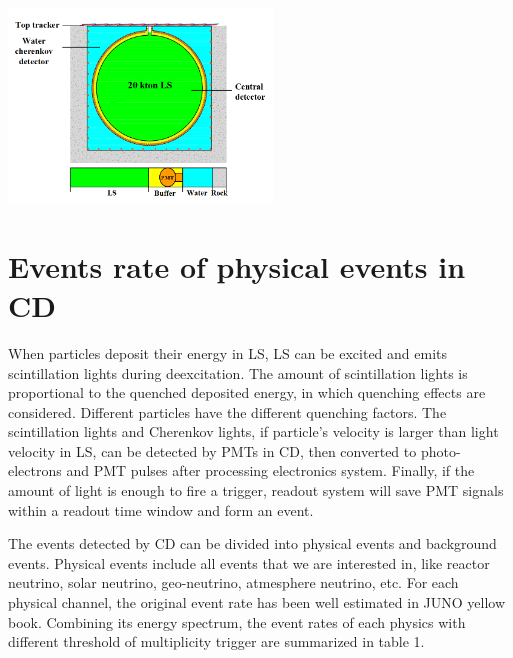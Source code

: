 \documentclass[a4paper,10pt,twoside]{paper}
\begin{document}
\begin{multicols}{2}
		\begin{center}
			\includegraphics[width=7cm]{CD.png}
		\end{center}


		\section{Events rate of physical events in CD}

                When particles deposit their energy in LS, LS can be excited and emits scintillation lights during deexcitation.
                The amount of scintillation lights is proportional to the quenched deposited energy, in which quenching effects are considered.
                Different particles have the different quenching factors. The scintillation lights and Cherenkov lights, if particle's velocity is larger than light velocity in LS, can be detected by PMTs in CD,
                then converted to photo-electrons and PMT pulses after processing electronics system. Finally, if the amount of light is enough to fire a trigger, readout system will save PMT signals within a readout time window and form an event.

                
		The events detected by CD can be divided into physical events and background events. Physical events include all events that we are interested in, 
                like reactor neutrino, solar neutrino, geo-neutrino, atmesphere neutrino, etc.
                For each physical channel, the original event rate has been well 
                estimated in JUNO yellow book. Combining its energy spectrum, 
                the event rates of each physics with different threshold of multiplicity trigger are summarized in table 1.


\end{multicols}
\end{document}

